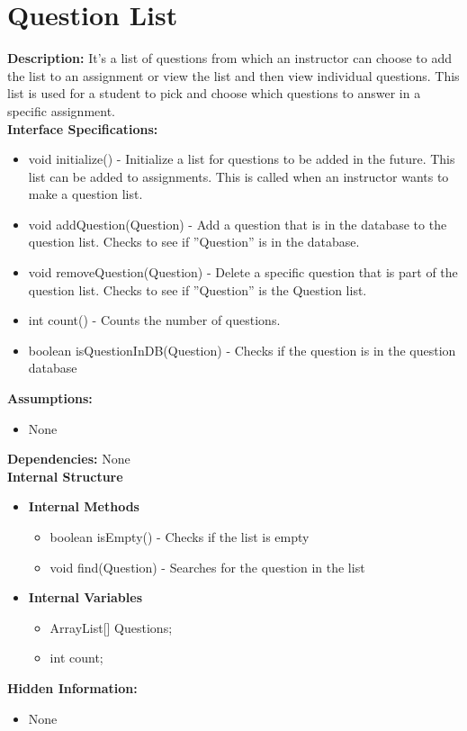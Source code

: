 \chapter{Question List}

\textbf{Description: }It's a list of questions from which an instructor can choose to add the list to an assignment or view the list and then view individual questions. This list is used for a student to pick and choose which questions to answer in a specific assignment. \\ 
\textbf{Interface Specifications:}
\begin{itemize}
\item void initialize() - Initialize a list for questions to be added in the future. This list can be added to assignments. This is called when an instructor wants to make a question list.

\item void addQuestion(Question) - Add a question that is in the database to the question list. Checks to see if ''Question'' is in the database. 

\item void removeQuestion(Question) - Delete a specific question that is part of the question list. Checks to see if ''Question'' is the Question list.

\item int count() - Counts the number of questions.

\item boolean isQuestionInDB(Question) - Checks if the question is in the question database
\end{itemize}
\textbf{Assumptions:}
\begin{itemize}
\item None
\end{itemize}
\textbf{Dependencies:} None \\
\textbf{Internal Structure}
\begin{itemize}
\item	\textbf{Internal Methods}
\begin{itemize}
	\item boolean isEmpty() - Checks if the list is empty
	\item void find(Question) - Searches for the question in the list
\end{itemize}
	\item \textbf{Internal Variables}
	\begin{itemize}
        \item ArrayList[] Questions;
	    \item int count;
    \end{itemize}
\end{itemize}
\textbf{Hidden Information:}
\begin{itemize}
\item None
\end{itemize}



